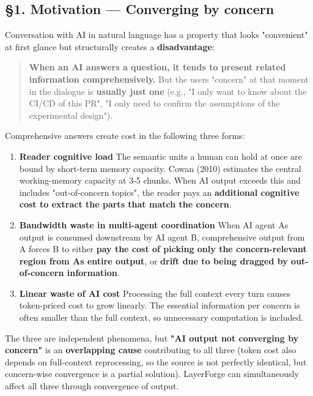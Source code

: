 \documentclass[
]{article}
\begin{document}
\subsection{§1. Motivation --- Converging by
concern}\label{1-motivation--converging-by-concern}

Conversation with AI in natural language has a property that looks
"convenient" at first glance but structurally creates a
\textbf{disadvantage}:

\begin{quote}
\textbf{When an AI answers a question, it tends to present related
information comprehensively.} But the user\textquotesingle s "concern"
at that moment in the dialogue is \textbf{usually just one} (e.g., "I
only want to know about the CI/CD of this PR", "I only need to confirm
the assumptions of the experimental design").
\end{quote}

Comprehensive answers create cost in the following three forms:

\begin{enumerate}
\def\labelenumi{\arabic{enumi}.}
\item
  \textbf{Reader cognitive load} The semantic units a human can hold at
  once are bound by short-term memory capacity. Cowan (2010) estimates
  the central working-memory capacity at 3-5 chunks. When AI output
  exceeds this and includes "out-of-concern topics", the reader pays an
  \textbf{additional cognitive cost to extract the parts that match the
  concern}.
\item
  \textbf{Bandwidth waste in multi-agent coordination} When AI agent
  A\textquotesingle s output is consumed downstream by AI agent B,
  comprehensive output from A forces B to either \textbf{pay the cost of
  picking only the concern-relevant region from A\textquotesingle s
  entire output}, or \textbf{drift due to being dragged by
  out-of-concern information}.
\item
  \textbf{Linear waste of AI cost} Processing the full context every
  turn causes token-priced cost to grow linearly. The essential
  information per concern is often smaller than the full context, so
  unnecessary computation is included.
\end{enumerate}

The three are independent phenomena, but \textbf{"AI output not
converging by concern"} is an \textbf{overlapping cause} contributing to
all three (token cost also depends on full-context reprocessing, so the
source is not perfectly identical, but concern-wise convergence is a
partial solution). LayerForge can simultaneously affect all three
through convergence of output.
\end{document}

